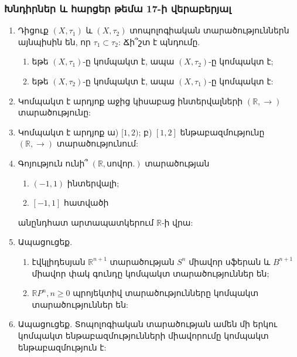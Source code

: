 \bigskip
\bigskip
\subsubsection*{Խնդիրներ և հարցեր թեմա 17-ի վերաբերյալ}

\begin{enumerate}[label=\thesection.\arabic*.]

\item Դիցուք $(X, \tau_1)$ և $(X, \tau_2)$ տոպոլոգիական տարածություններն այնպիսին են, որ $\tau_1 \subset \tau_2$: Ճի՞շտ է պնդումը.
\begin{enumerate}
    \item[ա)] եթե $(X, \tau_1)$-ը կոմպակտ է, ապա $(X, \tau_2)$-ը կոմպակտ է;
    \item[բ)] եթե $(X, \tau_2)$-ը կոմպակտ է, ապա $(X, \tau_1)$-ը կոմպակտ է:
\end{enumerate}

\item Կոմպակտ է արդյոք աջից կիսաբաց ինտերվալների $(\mathbb{R}, \to)$ տարածությունը:

\item Կոմպակտ է արդյոք ա) $[1, 2)$; բ) $[1, 2]$ ենթաբազմությունը $(\mathbb{R}, \to)$ տարածությունում:

\item Գոյություն ունի՞ $(\mathbb{R}, \text{սովոր.})$ տարածության
\begin{enumerate}
    \item[ա)] $(-1, 1)$ ինտերվալի;
    \item[բ)] $[-1, 1]$ հատվածի
\end{enumerate}
անընդհատ արտապատկերում $\mathbb{R}$-ի վրա:

\item Ապացուցեք.
\begin{enumerate}
    \item[ա)] էվկլիդեսյան $\mathbb{R}^{n+1}$ տարածության $S^n$ միավոր սֆերան և $B^{n+1}$ միավոր փակ գունդը կոմպակտ տարածություններ են;
    \item[բ)] $\mathbb{R}P^n, n \ge 0$ պրոյեկտիվ տարածությունները կոմպակտ տարածություններ են:
\end{enumerate}

\item Ապացուցեք. Տոպոլոգիական տարածության ամեն մի երկու կոմպակտ ենթաբազմությունների միավորումը կոմպակտ ենթաբազմություն է:


\end{enumerate}
